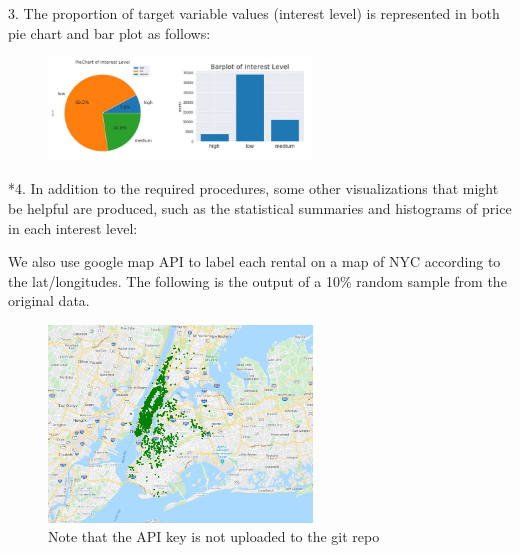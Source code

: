 \documentclass[12pt,twocolumn,letterpaper]{article}
\begin{document}
3. The proportion of target variable values (interest level) is represented in both pie chart and bar plot as follows:



\begin{figure}[h!]
    \centering
    \includegraphics[width=7cm]{CMPT459_pair2.png}
    \caption{}
    \label{fig:galaxy}
\end{figure}


*4. In addition to the required procedures, some other visualizations that might be helpful are produced, such as the statistical summaries and histograms of price in each interest level:  


\begin{figure}[h!]%
    \centering
    \qquad
    \caption{}%
    \label{fig:example}%
\end{figure}


We also use google map API to label each rental on a map of NYC according to the lat/longitudes. The following is the output of a 10\% random sample from the original data. 


\begin{figure}[h!]
    \centering
    \includegraphics[width=7cm]{rents_sample.png}
    \caption{Note that the API key is not uploaded to the git repo}
    \label{fig:galaxy}
\end{figure}
\end{document}
